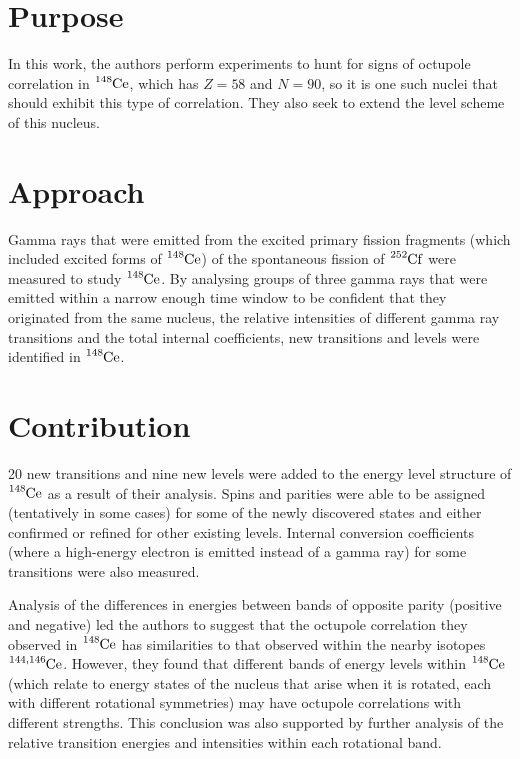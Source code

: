 \documentclass[12pt,a4paper]{article}
\begin{document}
\section*{Purpose}
In this work, the authors perform experiments to hunt for signs of octupole correlation in $\ce{^{148}Ce}$, which has $Z = 58$ and $N = 90$, so it is one such nuclei that should exhibit this type of correlation. They also seek to extend the level scheme of this nucleus.


\section*{Approach}
Gamma rays that were emitted from the excited primary fission fragments (which included excited forms of $\ce{^{148}Ce}$) of the spontaneous fission of $\ce{^{252}Cf}$ were measured to study $\ce{^{148}Ce}$. By analysing groups of three gamma rays that were emitted within a narrow enough time window to be confident that they originated from the same nucleus, the relative intensities of different gamma ray transitions and the total internal coefficients, %
new transitions and levels were identified in $\ce{^{148}Ce}$.

\section*{Contribution}
20 new transitions and nine new levels were added to the energy level structure of $\ce{^{148}Ce}$ as a result of their analysis. Spins and parities were able to be assigned (tentatively in some cases) for some of the newly discovered states and either confirmed or refined for other existing levels. Internal conversion coefficients (where a high-energy electron is emitted instead of a gamma ray) for some transitions were also measured. 

\medskip
Analysis of the differences in energies between bands of opposite parity (positive and negative) led the authors to suggest that the octupole correlation they observed in $\ce{^{148}Ce}$ has similarities to that observed within the nearby isotopes $\ce{^{144,146}Ce}$. However, they found that different bands of energy levels within $\ce{^{148}Ce}$ (which relate to energy states of the nucleus that arise when it is rotated, each with different rotational symmetries) may have octupole correlations with different strengths. This conclusion was also supported by further analysis of the relative transition energies and intensities within each rotational band. 
\end{document}
